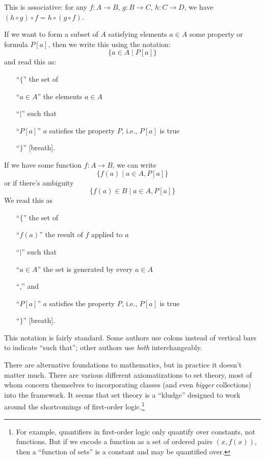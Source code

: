 This is associative: for any $f\colon A\to B$, $g\colon B\to C$,
$h\colon C\to D$, we have $(h\circ g)\circ f = h\circ(g\circ f)$.

If we want to form a subset of $A$ satisfying elements $a\in A$ some
property or formula $P[a]$, then we write this using the notation:
\begin{equation}
\{a\in A\mid P[a]\}
\end{equation}
and read this as:
\begin{itemize}
\item[``$\{$''] the set of
\item[``$a\in A$''] the elements $a\in A$
\item[``$\mid$''] such that
\item[``{$P[a]$}''] $a$ satisfies the property $P$, i.e., $P[a]$ is true
\item[``$\}$''] [breath].
\end{itemize}
If we have some function $f\colon A\to B$, we can write
\begin{equation}
\{f(a)\mid a\in A, P[a]\}
\end{equation}
or if there's ambiguity
\begin{equation}
\{f(a)\in B\mid a\in A, P[a]\}
\end{equation}
We read this as
\begin{itemize}
\item[``$\{$''] the set of
\item[``$f(a)$''] the result of $f$ applied to $a$
\item[``$\mid$''] such that
\item[``$a\in A$''] the set is generated by every $a\in A$
\item[``,''] and
\item[``{$P[a]$}''] $a$ satisfies the property $P$, i.e., $P[a]$ is true
\item[``$\}$''] [breath].
\end{itemize}
This notation is fairly standard. Some authors use colons instead of
vertical bars to indicate ``such that''; other authors use \emph{both}
interchangeably.

There are alternative foundations to mathematics, but in practice it
doesn't matter much. There are various different axiomatizations to set
theory, most of whom concern themselves to incorporating classes (and
even \emph{bigger} collections) into the framework. It seems that set
theory is a ``kludge'' designed to work around the shortcomings of
first-order logic.\footnote{For example, quantifiers in first-order
logic only quantify over constants, not functions. But if we encode a
function as a set of ordered pairs $(x,f(x))$, then a ``function of sets'' is 
a constant and may be quantified over.}

